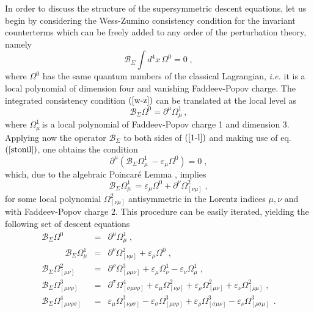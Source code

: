\documentclass[a4paper,12pt]{article}
\begin{document}
In order to discuss the structure of the supersymmetric descent equations,
let us begin by considering the Wess-Zumino consistency condition for the
invariant counterterms which can be freely added to any order of the
perturbation theory, namely 
\begin{equation}
\mathcal{B}_{\Sigma }\int d^{4}x\,\Omega ^{0}=0\;,  \label{w-z}
\end{equation}
where $\Omega ^{0}$ has the same quantum numbers of the classical
Lagrangian, \textit{i.e.} it is a local polynomial of dimension four and
vanishing Faddeev-Popov charge. The integrated consistency condition $\left( 
\ref{w-z}\right) $ can be translated at the local level as 
\begin{equation}
\mathcal{B}_{\Sigma }\Omega ^{0}=\partial ^{\mu }\Omega _{\mu \;}^{1},
\label{1-l}
\end{equation}
where $\Omega _{\mu \;}^{1}$is a local polynomial of Faddeev-Popov charge 1
and dimension 3. Applying now the operator $\mathcal{B}_{\Sigma }$ to both
sides of $\left( \ref{1-l}\right) $ and making use of eq.$\left( \ref{stonil}%
\right) $, one obtains the condition 
\begin{equation}
\partial ^{\mu }\left( \mathcal{B}_{\Sigma }\Omega _{\mu \;}^{1}-\varepsilon
_{\mu }\Omega ^{0}\right) =0\;,  \label{l-2}
\end{equation}
which, due to the algebraic Poincar\'{e} Lemma \cite{book}, implies 
\begin{equation}
\mathcal{B}_{\Sigma }\Omega _{\mu \;}^{1}=\varepsilon _{\mu }\Omega
^{0}+\partial ^{\nu }\Omega _{[\nu \mu ]}^{2}\;,  \label{l-3}
\end{equation}
for some local polynomial $\Omega _{[\nu \mu ]}^{2}$ antisymmetric in the
Lorentz indices $\mu ,\nu $ and with Faddeev-Popov charge 2. This procedure
can be easily iterated, yielding the following set of descent equations 
\begin{eqnarray}
\mathcal{B}_{\Sigma }\Omega ^{0} &=&\partial ^{\mu }\Omega _{\mu }^{1}\;, 
\nonumber \\
\,\,\,\,\,\,\,\,\;\;\;\;\;\mathcal{B}_{\Sigma }\Omega _{\mu }^{1}
&=&\partial ^{\nu }\Omega _{[\nu \mu ]}^{2}+\varepsilon _{\mu }\Omega ^{0}\;,
\nonumber \\
\mathcal{B}_{\Sigma }\Omega _{[\mu \nu ]}^{2} &=&\partial ^{\rho }\Omega
_{[\rho \mu \nu ]}^{3}+\varepsilon _{\mu }\Omega _{\nu }^{1}-\varepsilon
_{\nu }\Omega _{\mu }^{1}\;,  \nonumber \\
\mathcal{B}_{\Sigma }\Omega _{[\mu \nu \rho ]}^{3} &=&\partial ^{\sigma
}\Omega _{[\sigma \mu \nu \rho ]}^{4}+\varepsilon _{\mu }\Omega _{[\nu \rho
]}^{2}+\varepsilon _{\rho }\Omega _{[\mu \nu ]}^{2}+\varepsilon _{\nu
}\Omega _{[\rho \mu ]}^{2}\;,  \nonumber \\
\mathcal{B}_{\Sigma }\Omega _{[\mu \nu \rho \sigma ]}^{4} &=&\varepsilon
_{\mu }\Omega _{[\nu \rho \sigma ]}^{3}-\varepsilon _{\sigma }\Omega _{[\mu
\nu \rho ]}^{3}+\varepsilon _{\rho }\Omega _{[\sigma \mu \nu
]}^{3}-\varepsilon _{\nu }\Omega _{[\rho \sigma \mu ]}^{3}\;\,.  \label{sde}
\end{eqnarray}
\end{document}
